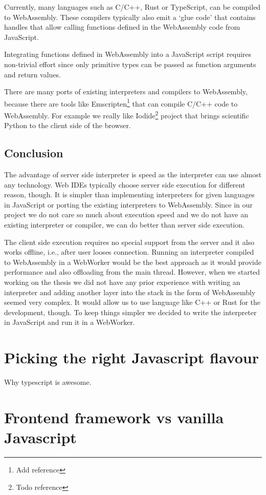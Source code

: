 Currently, many languages such as C/C++, Rust or TypeScript, can be compiled to WebAssembly. These compilers typically also emit
a `glue code' that contains handles that allow calling functions defined in the WebAssembly code from JavaScript.

Integrating functions defined in WebAssembly into a JavaScript script requires non-trivial effort since only primitive types can be passed
as function arguments and return values.

There are many ports of existing interpreters and compilers to WebAssembly, because there are tools like Emscripten\footnote{Add reference}
that can compile C/C++ code to WebAssembly. For example we really like Iodide\footnote{Todo reference} project that brings scientific Python
to the client side of the browser.

\subsection{Conclusion}
The advantage of server side interpreter is speed as the interpreter can use almost any technology. Web IDEs typically choose
server side execution for different reason, though. It is simpler than implementing interpreters for given languages in JavaScript or
porting the existing interpreters to WebAssembly. Since in our project we do not care so much about execution speed and
we do not have an existing interpreter or compiler, we can do better than server side execution.

The client side execution requires no special support from the server and it also works offline, i.e., after user looses connection. Running an interpreter
compiled to WebAssembly in a WebWorker would be the best approach as it would provide performance and also offloading from the main thread.
However, when we started working on the thesis we did not have any prior experience with writing an interpreter and adding another layer into the stack in the
form of WebAssembly seemed very complex. It would allow us to use language like C++ or Rust for the development, though. To keep things simpler we
decided to write the interpreter in JavaScript and run it in a WebWorker.

\section{Picking the right Javascript flavour}
Why typescript is awesome.


\section{Frontend framework vs vanilla Javascript}

